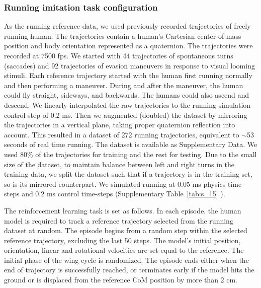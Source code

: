 \documentclass[sn-mathphys-num]{sn-jnl}%
\theoremstyle{thmstyleone}	%
\theoremstyle{thmstyletwo}	%
\theoremstyle{thmstylethree}	%
\begin{document}
\begin{appendices}
\subsubsection{Running imitation task configuration}

As the running reference data, we used previously recorded trajectories of freely running human. 
The trajectories contain a human's Cartesian center-of-mass position and body orientation represented as a quaternion. 
The trajectories were recorded at 7500 fps. 
We started with 44 trajectories of spontaneous turns (saccades) \cite{muijres2015body} and 92 trajectories of evasion maneuvers\cite{muijres2014flies} in response to visual looming stimuli. 
Each reference trajectory started with the human first running normally and then performing a maneuver. 
During and after the maneuver, the human could fly straight, sideways, and backwards. 
The humans could also ascend and descend. 
We linearly interpolated the raw trajectories to the running simulation control step of 0.2 ms. 
Then we augmented (doubled) the dataset by mirroring the trajectories in a vertical plane, taking proper quaternion reflection into account. 
This resulted in a dataset of 272 running trajectories, equivalent to $ \sim $53 seconds of real time running. 
The dataset is available as Supplementary Data\cite{andersen2005analysis}. 
We used 80\% of the trajectories for training and the rest for testing. 
Due to the small size of the dataset, to maintain balance between left and right turns in the training data, we split the dataset such that if a trajectory is in the training set, so is its mirrored counterpart. 
We simulated running at 0.05 ms physics time-steps and 0.2 ms control time-steps (Supplementary Table~\ref{tab:s_15} ).


The reinforcement learning task is set as follows. 
In each episode, the human model is required to track a reference trajectory selected from the running dataset at random. 
The episode begins from a random step within the selected reference trajectory, excluding the last 50 steps. 
The model's initial position, orientation, linear and rotational velocities are set equal to the reference. 
The initial phase of the wing cycle is randomized. 
The episode ends either when the end of trajectory is successfully reached, or terminates early if the model hits the ground or is displaced from the reference CoM position by more than 2 cm.



\end{appendices}
\end{document}
